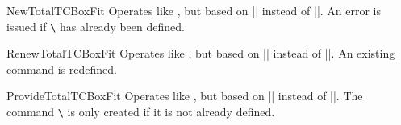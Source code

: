 \begin{docCommand}{NewTotalTCBoxFit}{}
  Operates like , but based on |\NewDocumentCommand| instead of |\DeclareDocumentCommand|.
  An error is issued if \texttt{\textbackslash} has already been defined.
\end{docCommand}

\begin{docCommand}{RenewTotalTCBoxFit}{}
  Operates like , but based on |\RenewDocumentCommand| instead of |\DeclareDocumentCommand|.
  An existing command is redefined.
\end{docCommand}

\begin{docCommand}{ProvideTotalTCBoxFit}{}
  Operates like , but based on |\ProvideDocumentCommand| instead of |\DeclareDocumentCommand|.
  The command \texttt{\textbackslash} is only created if it is not already defined.
\end{docCommand}
